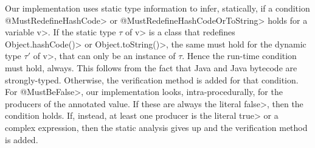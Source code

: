Our implementation uses static type information to infer, statically, if a condition
\<@MustRedefineHashCode> or \<@MustRedefineHashCodeOrToString> holds for a variable \<v>.
If the static type
$\tau$ of \<v> is a class that redefines \<Object.hashCode()> or \<Object.toString()>,
the same must hold for the dynamic type $\tau'$ of \<v>, that can only be an
instance of $\tau$. Hence the run-time condition must hold, always.
This follows from the fact that Java and Java bytecode
are strongly-typed. Otherwise, the verification method is added for that condition.
For \<@MustBeFalse>, our implementation looks, intra-procedurally, for
the producers of the annotated value.
If these are always the literal \<false>, then the condition holds.
If, instead, at least one producer is the literal \<true> or a complex expression,
then the static analysis gives up and the verification method is added.
